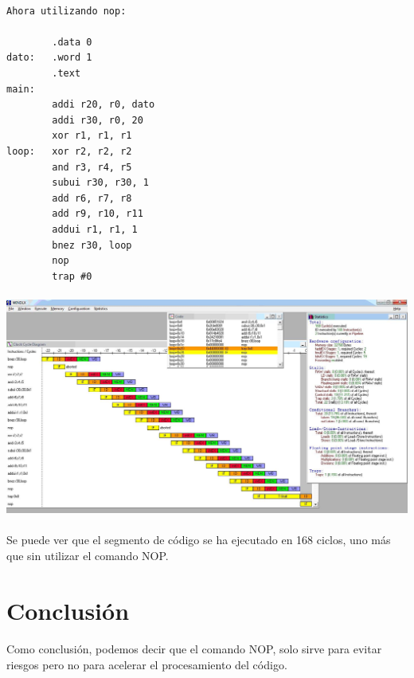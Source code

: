 \documentclass[a4paper,11pt]{article}
\begin{document}
\begin{enumerate}
\paragraph{}
\begin{center}
\begin{verbatim}
Ahora utilizando nop:

		.data 0
dato: 	.word 1
		.text
main:
		addi r20, r0, dato
		addi r30, r0, 20
		xor r1, r1, r1
loop: 	xor r2, r2, r2
		and r3, r4, r5
		subui r30, r30, 1
		add r6, r7, r8
		add r9, r10, r11
		addui r1, r1, 1
		bnez r30, loop
		nop
		trap #0
\end{verbatim}
\end{center}

\paragraph{}
\centering
\includegraphics[width=470pt]{punto5-4.JPG}

\paragraph{}
Se puede ver que el segmento de c\'odigo se ha ejecutado en 168 ciclos, uno m\'as que sin utilizar el comando NOP.



\end{enumerate}

\newpage 

\section{Conclusi\'on}
\paragraph{}
Como conclusi\'on, podemos decir que el comando NOP, solo sirve para evitar riesgos pero no para acelerar el procesamiento del c\'odigo.
\end{document}
